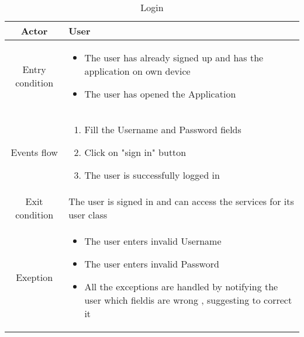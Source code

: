 \documentclass{article}
\begin{document}
		\begin{table} [H]
		\begin{center}
		\caption{Login}
		\begin{tabular}{|c|p{8cm}|}
			\hline
			Actor&User\\
			\hline
			Entry condition& \begin{itemize}
								\item The user has already signed up and has the application on own device
								\item The user has opened the Application
							\end{itemize}\\
			\hline
			Events flow& \begin{enumerate}
							\item Fill the Username and Password fields 
							\item Click on "sign in" button
							\item The user is successfully logged in 
			
						\end{enumerate}\\
			\hline
			Exit condition& The user is signed in and can access the services for its user class\\
			\hline
			Exeption& \begin{itemize}
							\item The user enters invalid Username
							\item The user enters invalid Password
							\item All the exceptions are handled by notifying the user which fieldis are wrong , suggesting to correct it
						\end{itemize}\\
			\hline
		\end{tabular}
		\end{center}
		\end{table} 
\end{document}
